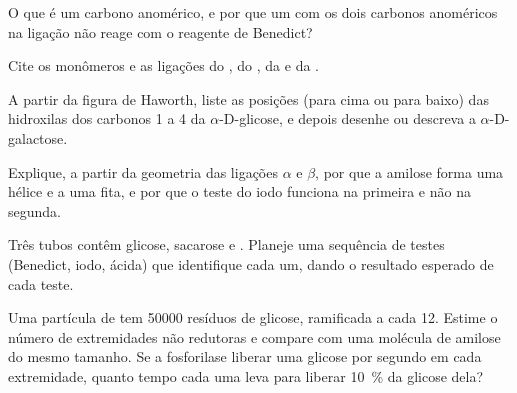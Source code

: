 \begin{exercise}[$\star$]\label{exo:b1:carbohydrates:2}
O que é um carbono anomérico, e por que um  com os dois
carbonos anoméricos na ligação não reage com o reagente de Benedict?
\end{exercise}

\begin{exercise}[$\star$]\label{exo:b1:carbohydrates:3}
Cite os monômeros e as ligações do , do , da  e
da .
\end{exercise}

\begin{exercise}[$\star$]\label{exo:b1:carbohydrates:4}
A partir da figura de Haworth, liste as posições (para cima ou para
baixo) das hidroxilas dos carbonos 1 a 4 da $\alpha$-D-glicose, e depois
desenhe ou descreva a $\alpha$-D-galactose.
\end{exercise}

\begin{exercise}[$\star\star$]\label{exo:b1:carbohydrates:5}
Explique, a partir da geometria das ligações $\alpha$ e $\beta$, por que
a amilose forma uma hélice e a  uma fita, e por que o teste do
iodo funciona na primeira e não na segunda.
\end{exercise}

\begin{exercise}[$\star\star$]\label{exo:b1:carbohydrates:6}
Três tubos contêm glicose, sacarose e . Planeje uma sequência de
testes (Benedict, iodo,  ácida) que identifique cada um, dando
o resultado esperado de cada teste.
\end{exercise}

\begin{exercise}[$\star\star$]\label{exo:b1:carbohydrates:7}
Uma partícula de  tem \num{50000} resíduos de glicose,
ramificada a cada 12. Estime o número de extremidades não redutoras e
compare com uma molécula de amilose do mesmo tamanho. Se a fosforilase
liberar uma glicose por segundo em cada extremidade, quanto tempo cada
uma leva para liberar \qty{10}{\%} da glicose dela?
\end{exercise}

